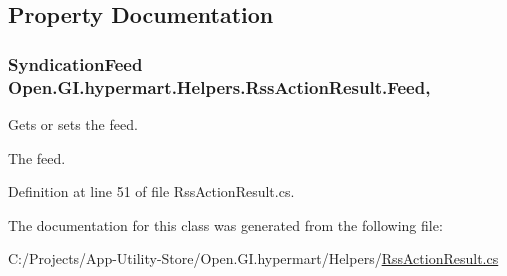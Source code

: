 \subsection{Property Documentation}
\hypertarget{class_open_1_1_g_i_1_1hypermart_1_1_helpers_1_1_rss_action_result_a3b07cc4558b6a4863821fbedd9aa6888}{}
\subsubsection[{Feed}]{\setlength{\rightskip}{0pt plus 5cm}Syndication\+Feed Open.\+G\+I.\+hypermart.\+Helpers.\+Rss\+Action\+Result.\+Feed\hspace{0.3cm}{\ttfamily [get]}, {\ttfamily [set]}}\label{class_open_1_1_g_i_1_1hypermart_1_1_helpers_1_1_rss_action_result_a3b07cc4558b6a4863821fbedd9aa6888}


Gets or sets the feed. 

The feed. 

Definition at line 51 of file Rss\+Action\+Result.\+cs.



The documentation for this class was generated from the following file\+:\begin{DoxyCompactItemize}
\item 
C\+:/\+Projects/\+App-\/\+Utility-\/\+Store/\+Open.\+G\+I.\+hypermart/\+Helpers/\hyperlink{_rss_action_result_8cs}{Rss\+Action\+Result.\+cs}\end{DoxyCompactItemize}
